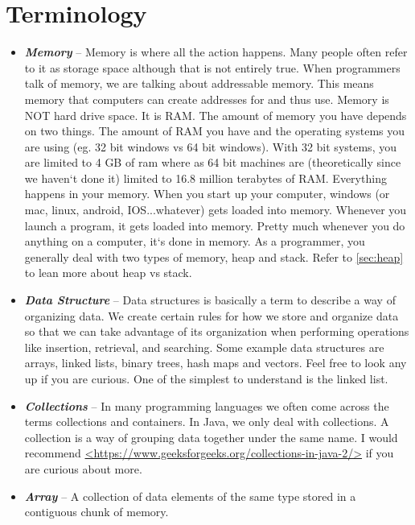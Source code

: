 \documentclass[11]{article}
\begin{document}
\section{Terminology}
\begin{itemize}
  \item \textbf{\textit{Memory}} --
  Memory is where all the action happens. Many people often refer to it as storage space although that is not entirely true. When programmers talk of memory, we are talking about addressable memory. This means memory that computers can create addresses for and thus use. Memory is NOT hard drive space. It is RAM. The amount of memory you have depends on two things. The amount of RAM you have and the operating systems you are using (eg. 32 bit windows vs 64 bit windows). With 32 bit systems, you are limited to 4 GB of ram where as 64 bit machines are (theoretically since we haven`t done it) limited to 16.8 million terabytes of RAM. Everything happens in your memory. When you start up your computer, windows (or mac, linux, android, IOS...whatever) gets loaded into memory. Whenever you launch a program, it gets loaded into memory. Pretty much whenever you do anything on a computer, it`s done in memory. As a programmer, you generally deal with two types of memory, heap and stack. Refer to \autoref{sec:heap} to lean more about heap vs stack.

  
  \item \textbf{\textit{Data Structure}} -- Data structures is basically a term to describe a way of organizing data. We create certain rules for how we store and organize data so that we can take advantage of its organization when performing operations like insertion, retrieval, and searching. Some example data structures are arrays, linked lists, binary trees, hash maps and vectors. Feel free to look any up if you are curious. One of the simplest to understand is the linked list.
  
  \item \textbf{\textit{Collections}} -- In many programming languages we often come across the terms collections and containers. In Java, we only deal with collections. A collection is a way of grouping data together under the same name. I would recommend \url{<https://www.geeksforgeeks.org/collections-in-java-2/>} if you are curious about more.
  
  \item \textbf{\textit{Array}} -- A collection of data elements of the same type stored in a contiguous chunk of memory.
  

\end{itemize}
\end{document}
